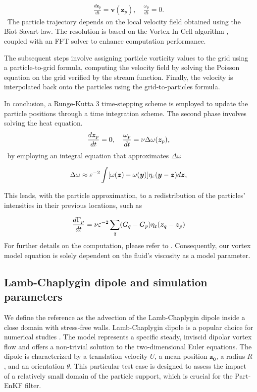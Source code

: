 \begin{eqnarray*}
	\frac{d\bm z_p}{dt} = \bm{v}(\bm z_p), \quad \frac{\omega_p}{dt} = 0.
\end{eqnarray*}~The particle trajectory depends on the local velocity field obtained using the Biot-Savart law. The resolution is based on the Vortex-In-Cell algorithm \cite{christiansen_1973, birdsall_1969}, coupled with an FFT solver to enhance computation performance.

The subsequent steps involve assigning particle vorticity values to the grid using a particle-to-grid formula, computing the velocity field by solving the Poisson equation on the grid verified by the stream function. Finally, the velocity is interpolated back onto the particles using the grid-to-particles formula.

In conclusion, a Runge-Kutta 3 time-stepping scheme is employed to update the particle positions through a time integration scheme. The second phase involves solving the heat equation.
\begin{equation*}
	\frac{d\bm{z}_p}{dt} = 0, \quad	\frac{\omega_p}{dt} = \nu \Delta \omega(\bm{z}_p),
\end{equation*}~by employing an integral equation that approximates $\Delta \omega$

\begin{equation*}
	\Delta \omega \approx \varepsilon^{-2} \int [\omega(\bm{z})  - \omega(\bm{y})] \eta_\varepsilon(\bm{y} - \bm{z}) d\bm{z},
\end{equation*}

This leads, with the particle approximation, to a redistribution of the particles' intensities in their previous locations, such as

\begin{equation*}
	\frac{d\Gamma_p}{dt} = \nu \varepsilon^{-2} \sum_q (G_q - G_p) \eta_\varepsilon(\bm{z}_q - \bm{z}_p)
\end{equation*}
For further details on the computation, please refer to \cite{cottet_1990}. Consequently, our vortex model equation is solely dependent on the fluid's viscosity as a model parameter.


\subsection{Lamb-Chaplygin dipole and simulation parameters}

We define the reference as the advection of the Lamb-Chaplygin dipole inside a close domain with stress-free walls. Lamb-Chaplygin dipole is a popular choice for numerical studies \cite{orlandi_vortex_1990}. The model represents a specific steady, inviscid dipolar vortex flow and offers a non-trivial solution to the two-dimensional Euler equations. The dipole is characterized by a translation velocity $U$, a mean position $\bm{z_0}$, a radius $R$, and an orientation $\theta$. This particular test case is designed to assess the impact of a relatively small domain of the particle support, which is crucial for the Part-EnKF filter.


